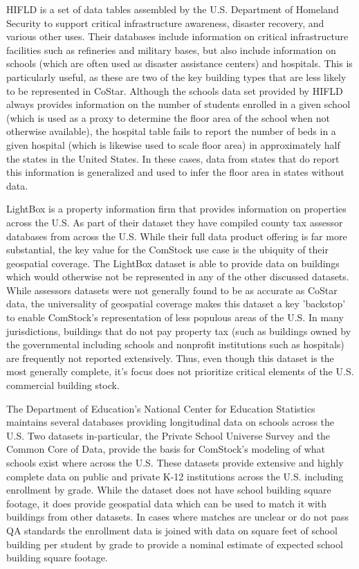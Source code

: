 HIFLD is a set of data tables assembled by the U.S. Department of Homeland Security to support critical infrastructure awareness, disaster recovery, and various other uses. Their databases include information on critical infrastructure facilities such as refineries and military bases, but also include information on schools (which are often used as disaster assistance centers) and hospitals. This is particularly useful, as these are two of the key building types that are less likely to be represented in CoStar. Although the schools data set provided by HIFLD always provides information on the number of students enrolled in a given school (which is used as a proxy to determine the floor area of the school when not otherwise available), the hospital table fails to report the number of beds in a given hospital (which is likewise used to scale floor area) in approximately half the states in the United States. In these cases, data from states that do report this information is generalized and used to infer the floor area in states without data.

LightBox is a property information firm that provides information on properties across the U.S. As part of their dataset they have compiled county tax assessor databases from across the U.S. While their full data product offering is far more substantial, the key value for the ComStock use case is the ubiquity of their geospatial coverage. \citep{lightbox_aboutus} The LightBox dataset is able to provide data on buildings which would otherwise not be represented in any of the other discussed datasets. While assessors datasets were not generally found to be as accurate as CoStar data, the universality of geospatial coverage makes this dataset a key 'backstop' to enable ComStock's representation of less populous areas of the U.S. In many jurisdictions, buildings that do not pay property tax (such as buildings owned by the governmental including schools and nonprofit institutions such as hospitals) are frequently not reported extensively. Thus, even though this dataset is the most generally complete, it's focus does not prioritize critical elements of the U.S. commercial building stock.

The Department of Education's National Center for Education Statistics maintains several databases providing longitudinal data on schools across the U.S. Two datasets in-particular, the Private School Universe Survey and the Common Core of Data, provide the basis for ComStock's modeling of what schools exist where across the U.S. \citep{nces_ccd} \citep{nces_pps} These datasets provide extensive and highly complete data on public and private K-12 institutions across the U.S. including enrollment by grade. While the dataset does not have school building square footage, it does provide geospatial data which can be used to match it with buildings from other datasets. In cases where matches are unclear or do not pass QA standards the enrollment data is joined with data on square feet of school building per student by grade to provide a nominal estimate of expected school building square footage.


